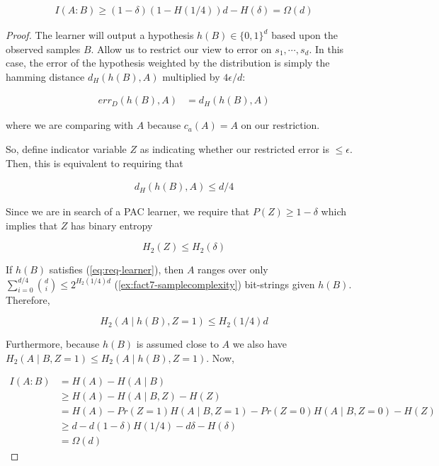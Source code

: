 \documentclass[main.tex]{subfiles}
\begin{document}
\begin{lemma}
\begin{align*}
I(A:B)\geq (1-\delta)(1-H(1/4))d-H(\delta)= \Omega(d)
\end{align*}

\begin{proof}
The learner will output a hypothesis $h(B) \in \{0, 1\}^d$ based upon the observed samples $B$. Allow us to restrict our view to error on $s_1, \cdots, s_d$. In this case, the error of the hypothesis weighted by the distribution is simply the hamming distance $d_H(h(B), A)$ multiplied by $4 \epsilon / d$:

\begin{align*}
err_D(h(B), A) &= d_H(h(B), A)
\end{align*}

where we are comparing with $A$ because $c_a(A) = A$ on our restriction. 

So, define indicator variable $Z$ as indicating whether our restricted error is $\leq \epsilon$. Then, this is equivalent to requiring that 

\begin{align}
\label{eq:req-learner}
d_H(h(B), A) \leq d/4
\end{align}

Since we are in search of a PAC learner, we require that $P(Z) \geq 1 - \delta$ which implies that $Z$ has binary entropy 

$$H_2(Z) \leq H_2(\delta)$$

If $h(B)$ satisfies (\ref{eq:req-learner}), then $A$ ranges over only $\sum_{i=0}^{d/4} \binom{d}{i} \leq 2^{H_2(1/4)d}$ (\ref{ex:fact7-samplecomplexity}) bit-strings given $h(B)$. Therefore, 

$$H_2(A \mid h(B), Z=1) \leq H_2(1/4)d$$ 

Furthermore, because $h(B)$ is assumed close to $A$ we also have $H_2(A \mid B, Z=1) \leq H_2(A \mid h(B), Z=1)$. Now,

\begin{align*}
I(A : B) &= H(A) - H(A \mid B) \\
&\geq H(A) - H(A \mid B, Z) - H(Z) \\
&= H(A) - Pr(Z = 1) H(A \mid B, Z=1) -Pr(Z=0)H(A \mid B, Z = 0) - H(Z) \\
&\geq d - d(1 - \delta) H(1/4) - d\delta - H(\delta)\\
&= \Omega(d)
\end{align*}
\end{proof}
\end{lemma}
\end{document}
